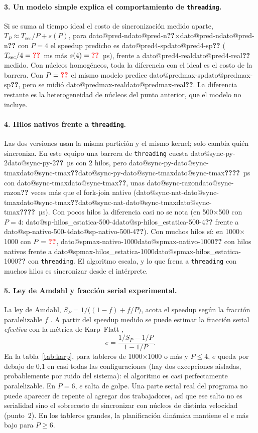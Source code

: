 \documentclass[11pt,a4paper]{article}
\makeatletter
\newcommand{\dato}[1]{\ifcsname dato@#1\endcsname\csname dato@#1\endcsname\else\textbf{\color{red}??}\fi}
\newcommand{\x}{$\times$}
\newcommand{\code}[1]{\texttt{#1}}
\makeatother
\begin{document}
\paragraph{3. Un modelo simple explica el comportamiento de \code{threading}.}
Si se suma al tiempo ideal el costo de sincronización medido aparte, $T_P \approx T_{\text{sec}}/P + s(P)$, para
\dato{pred-n}\x\dato{pred-n} con $P=4$ el speedup predicho es \dato{pred4-sp}
($T_{\text{sec}}/4=\dato{pred4-ideal-ms}$~ms más $s(4)=\dato{sync-py-4}$~µs), frente a \dato{pred4-real} medido. Con
núcleos homogéneos, toda la diferencia con el ideal es el costo de la barrera. Con $P=\dato{sync-tmax}$ el mismo modelo
predice \dato{predmax-sp}, pero se midió \dato{predmax-real}. La diferencia restante es la heterogeneidad de núcleos
del punto anterior, que el modelo no incluye.

\paragraph{4. Hilos nativos frente a \code{threading}.}
Las dos versiones usan la misma partición y el mismo kernel; solo cambia quién sincroniza. En este equipo una barrera de
\code{threading} cuesta \dato{sync-py-2}~µs con 2 hilos, pero \dato{sync-py-\dato{sync-tmax}}~µs con
\dato{sync-tmax}, unas \dato{sync-razon} veces más que el fork-join nativo (\dato{sync-nat-\dato{sync-tmax}}~µs).
Con pocos hilos la diferencia casi no se nota (en 500\x500 con $P=4$: \dato{sp-hilos_estatica-500-4} frente a
\dato{sp-nativo-500-4}). Con muchos hilos sí: en 1000\x1000 con $P=\dato{pmax}$, \dato{spmax-nativo-1000} con
hilos nativos frente a \dato{spmax-hilos_estatica-1000} con \code{threading}. El algoritmo escala, y lo que frena a
\code{threading} con muchos hilos es sincronizar desde el intérprete.

\paragraph{5. Ley de Amdahl y fracción serial experimental.}
La ley de Amdahl, $S_P = 1/\big((1-f) + f/P\big)$, acota el speedup según la fracción paralelizable $f$
\cite{pastrana-paralelismo}. A partir del speedup medido se puede estimar la fracción serial \emph{efectiva}
con la métrica de Karp--Flatt \cite{karpflatt},
\[
  e = \frac{1/S_P - 1/P}{1 - 1/P}.
\]
En la tabla~\ref{tab:karp}, para tableros de 1000\x1000 o más y $P\le4$, $e$ queda por debajo de 0,1 en casi todas
las configuraciones (hay dos excepciones aisladas, probablemente por ruido del sistema): el algoritmo es casi
perfectamente paralelizable. En $P=6$, $e$ salta de golpe. Una parte serial real del programa
no puede aparecer de repente al agregar dos trabajadores, así que ese salto no es serialidad sino el sobrecosto de
sincronizar con núcleos de distinta velocidad (punto~2). En los tableros grandes, la planificación dinámica mantiene el
$e$ más bajo para $P\ge6$.
\end{document}
